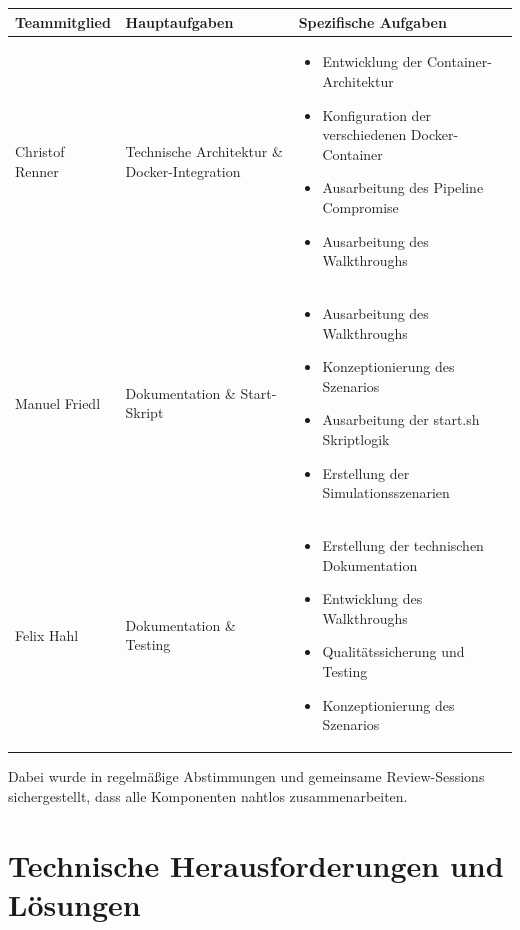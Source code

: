 \documentclass[12pt]{scrartcl}
\begin{document}
    \begin{longtable}{|p{3cm}|p{5cm}|p{6cm}|}
    \hline
    \textbf{Teammitglied} & \textbf{Hauptaufgaben} & \textbf{Spezifische Aufgaben} \\
    \hline
    \endhead
    
    Christof Renner & Technische Architektur \& Docker-Integration & 
    \begin{itemize}
      \item Entwicklung der Container-Architektur
      \item Konfiguration der verschiedenen Docker-Container
      \item Ausarbeitung des Pipeline Compromise
      \item Ausarbeitung des Walkthroughs
    \end{itemize} \\
    \hline

    Manuel Friedl & Dokumentation \& Start-Skript & 
    \begin{itemize}
      \item Ausarbeitung des Walkthroughs
      \item Konzeptionierung des Szenarios
      \item Ausarbeitung der start.sh Skriptlogik
      \item Erstellung der Simulationsszenarien
    \end{itemize} \\
    \hline
    
    Felix Hahl & Dokumentation \& Testing & 
    \begin{itemize}
      \item Erstellung der technischen Dokumentation
      \item Entwicklung des Walkthroughs
      \item Qualitätssicherung und Testing
      \item Konzeptionierung des Szenarios
    \end{itemize} \\
    \hline
    \end{longtable}

    Dabei wurde in regelmäßige Abstimmungen und gemeinsame Review-Sessions sichergestellt, dass alle Komponenten nahtlos zusammenarbeiten.

    \newpage

    \section{Technische Herausforderungen und Lösungen}
        
\end{document}
